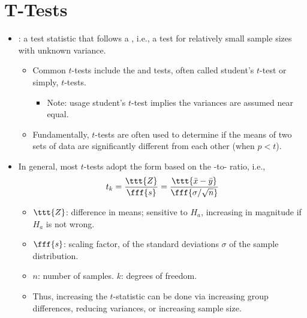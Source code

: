 \section{T-Tests}
\begin{itemize}
  \item {}: a test statistic that follows a \hyperref[Subsection: Primer: Probability Distributions]{}, i.e., a test for relatively small sample sizes with unknown variance. 
    \begin{itemize}
      \item Common \(t\)-tests include the \hyperref[Subsection: One-Sample and Two-Sample T-Tests]{} and \hyperref[Subsection: One-Sample and Two-Sample T-Tests]{} tests, often called student's \(t\)-test or simply, \(t\)-tests.
        \begin{itemize}
          \item Note: usage student's \(t\)-test implies the variances are assumed near equal.
        \end{itemize}
      \item Fundamentally, \(t\)-tests are often used to determine if the means of two sets of data are significantly different from each other (when \(p < t\)).
    \end{itemize}
  \item In general, most \(t\)-tests adopt the form based on the -to- ratio, i.e., 
  \[%
  t_k = \frac{\ttt{Z}}{\fff{s}} = \frac{\ttt{\bar{x}-\bar{y}}}{\fff{\sigma/\sqrt{n}}}
  \]%
  \begin{itemize}
    \item \(\ttt{Z}\): difference in means; sensitive to \(H_a\), increasing in magnitude if \(H_a\) is not wrong.
    \item \(\fff{s}\): scaling factor, of the standard deviations \(\sigma \) of the sample distribution. 
    \item \(n\): number of samples. \(k\): degrees of freedom.
    \item Thus, increasing the \(t\)-statistic can be done via increasing group differences, reducing variances, or increasing sample size.
  \end{itemize}


\end{itemize}
